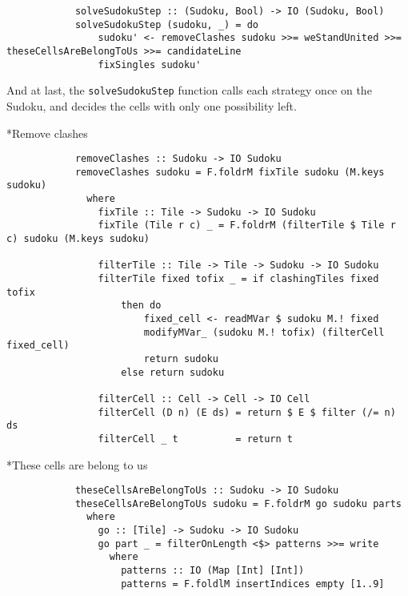 \documentclass[a4paper,12pt]{article}
\begin{document}
\begin{section}
\begin{subsection}
\begin{subsubsection}
            \begin{lstlisting}
            solveSudokuStep :: (Sudoku, Bool) -> IO (Sudoku, Bool)
            solveSudokuStep (sudoku, _) = do
                sudoku' <- removeClashes sudoku >>= weStandUnited >>= theseCellsAreBelongToUs >>= candidateLine
                fixSingles sudoku'
            \end{lstlisting}

            And at last, the \texttt{solveSudokuStep} function calls each
            strategy once on the Sudoku, and decides the cells with only one
            possibility left.

        \end{subsubsection}

        \begin{subsubsection}*{Remove clashes}

            \begin{lstlisting}
            removeClashes :: Sudoku -> IO Sudoku
            removeClashes sudoku = F.foldrM fixTile sudoku (M.keys sudoku)
              where
                fixTile :: Tile -> Sudoku -> IO Sudoku
                fixTile (Tile r c) _ = F.foldrM (filterTile $ Tile r c) sudoku (M.keys sudoku)

                filterTile :: Tile -> Tile -> Sudoku -> IO Sudoku
                filterTile fixed tofix _ = if clashingTiles fixed tofix
                    then do
                        fixed_cell <- readMVar $ sudoku M.! fixed
                        modifyMVar_ (sudoku M.! tofix) (filterCell fixed_cell)
                        return sudoku
                    else return sudoku

                filterCell :: Cell -> Cell -> IO Cell
                filterCell (D n) (E ds) = return $ E $ filter (/= n) ds
                filterCell _ t          = return t
            \end{lstlisting}

        \end{subsubsection}


        \begin{subsubsection}*{These cells are belong to us}

            \begin{lstlisting}
            theseCellsAreBelongToUs :: Sudoku -> IO Sudoku
            theseCellsAreBelongToUs sudoku = F.foldrM go sudoku parts
              where
                go :: [Tile] -> Sudoku -> IO Sudoku
                go part _ = filterOnLength <$> patterns >>= write
                  where
                    patterns :: IO (Map [Int] [Int])
                    patterns = F.foldlM insertIndices empty [1..9]


\end{lstlisting}
\end{subsubsection}
\end{subsection}
\end{section}
\end{document}
